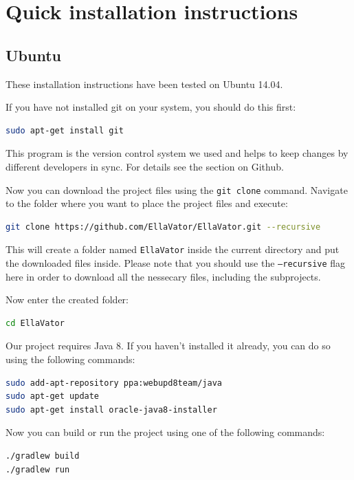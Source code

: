 \documentclass[a4paper, 12pt]{article}
\begin{document}
\section{Quick installation instructions}
\subsection{Ubuntu}
These installation instructions have been tested on Ubuntu 14.04.

If you have not installed git on your system, you should do this first:
\begin{lstlisting}[language=bash]
sudo apt-get install git
\end{lstlisting}

This program is the version control system we used and helps to keep changes by different developers in sync.
For details see the section on Github.

Now you can download the project files using the \texttt{git clone} command.
Navigate to the folder where you want to place the project files and execute:
\begin{lstlisting}[language=bash]
git clone https://github.com/EllaVator/EllaVator.git --recursive
\end{lstlisting}

This will create a folder named \texttt{EllaVator} inside the current directory and put the downloaded files inside.
Please note that you should use the \texttt{--recursive} flag here in order to download all the nessecary files, including the subprojects.

Now enter the created folder:
\begin{lstlisting}[language=bash]
cd EllaVator
\end{lstlisting}

Our project requires Java 8. If you haven't installed it already, you can do so using the following commands:
\begin{lstlisting}[language=bash]
sudo add-apt-repository ppa:webupd8team/java
sudo apt-get update
sudo apt-get install oracle-java8-installer
\end{lstlisting}

Now you can build or run the project using one of the following commands:
\begin{lstlisting}[language=bash]
./gradlew build
./gradlew run
\end{lstlisting}


\end{document}

